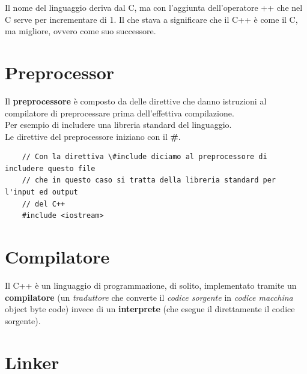 \textsf{Il nome del linguaggio deriva dal C, ma con l'aggiunta dell'operatore ++ che nel C serve per incrementare di 1. Il che stava a significare che il C++ è come il C, ma migliore, ovvero come suo successore.}\\


\newpage

\section{Preprocessor}

\textsf{\small Il \textbf{preprocessore} è composto da delle direttive che danno istruzioni al compilatore di preprocessare prima dell'effettiva compilazione.} \\

\textsf{\small Per esempio di includere una libreria standard del linguaggio.} \\

\textsf{\small Le direttive del preprocessore iniziano con il \textbf{\#}.} \\

\begin{lstlisting}
	// Con la direttiva \#include diciamo al preprocessore di includere questo file
	// che in questo caso si tratta della libreria standard per l'input ed output
	// del C++
	#include <iostream> 
\end{lstlisting}


\section{Compilatore}

\textsf{\small Il C++ è un linguaggio di programmazione, di solito, implementato tramite un \textbf{compilatore} (un \emph{traduttore} che converte il \emph{codice sorgente} in \emph{codice macchina} object byte code) invece di un \textbf{interprete} (che esegue il direttamente il codice sorgente).} \\



\section{Linker}

